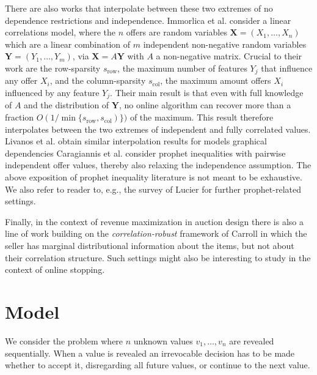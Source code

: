 \documentclass[11pt,a4paper]{article}
\numberwithin{equation}{section}
\begin{document}
There are also works that interpolate between these two extremes of no dependence restrictions and independence.
Immorlica et al. \cite{immorlica2023prophet}
consider a linear correlations model, where the $n$ offers are random variables $\mathbf{X} = (X_1,\dots,X_n)$ which are a linear combination of $m$ independent non-negative random variables $\boldsymbol{Y} = (Y_1,\dots,Y_m)$, via $\boldsymbol{X}=A\boldsymbol{Y}$ with $A$ a non-negative matrix.
Crucial to their work are
the row-sparsity $s_{\text{row}}$, the maximum number of features $Y_j$ that influence any offer $X_i$, and the column-sparsity $s_{\text{col}}$, the maximum amount offers $X_i$ influenced by any feature $Y_j$.
Their main result is that even with full knowledge of $A$ and the distribution of $\boldsymbol{Y}$, no online algorithm can recover more than a fraction $O(1/\min\{s_{\text{row}},s_{\text{col}})\})$
of the maximum. This result therefore interpolates between the two extremes of independent and fully correlated values.
Livanos et al. \cite{livanos2024improved} obtain similar interpolation results for models 
graphical dependencies 
Caragiannis et al. \cite{caragiannis2021relaxing} consider prophet inequalities with pairwise independent offer values, thereby also relaxing the independence assumption. The above exposition of prophet inequality literature is not meant to be exhaustive. We also refer to reader to, e.g., the survey of Lucier \cite{lucier2017economic} for further prophet-related settings. 

Finally, in the context of revenue maximization in auction design there is also a line of work \cite{gravin2018,bei2019correlation,babaioff2020escaping} building on the \textit{correlation-robust} framework of Carroll \cite{carroll2017robustness} in which the seller has marginal distributional information about the items, but not about their correlation structure. Such settings might also be interesting to study in the context of online stopping.





\section{Model}
\label{sec:model}
We consider the problem where $n$ unknown values $v_1,\dots,v_n$ are revealed sequentially. 
When a value is revealed an irrevocable decision has to be made whether to accept it, disregarding all future values, or continue to the next value.
\end{document}
